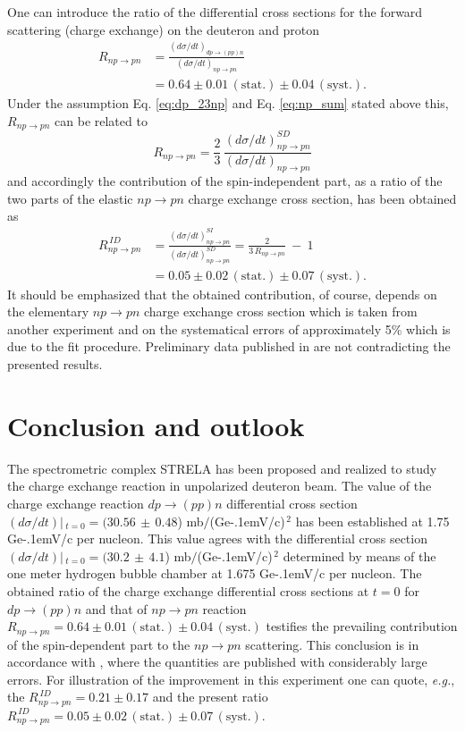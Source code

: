 \documentclass[twocolumn,epjc3]{svjour3}
\newcommand{\np}     {\ensuremath{np \rightarrow pn}\xspace}
\newcommand{\dpchex} {\ensuremath{dp \rightarrow (pp)n}\xspace}
\newcommand{\GeVc}   {Ge\kern-.1emV/c\xspace}
\begin{document}
One can introduce the ratio of the differential cross sections for the forward
scattering (charge exchange) on the deuteron and proton
\begin{equation}
  \begin{split}
    R_{\np} &= \frac{(d\sigma/dt)_{\dpchex}}{(d\sigma/dt)_{\np}} \\
    &= 0.64 \pm 0.01\,\mathrm{(stat.)} \pm 0.04\,\mathrm{(syst.)}.
  \end{split}
\end{equation}
Under the assumption Eq. \eqref{eq:dp_23np} and Eq. \eqref{eq:np_sum} stated
above this, $R_{\np}$ can be related to
\begin{equation}
  R_{\np} = \frac{2}{3}\,\frac{(d\sigma/dt)^{SD}_{\np}}{(d\sigma/dt)_{\np}}
\end{equation}
and accordingly the contribution of the spin-independent part, as a ratio of the
two parts of the elastic \np charge exchange cross section, has been obtained as
\begin{equation}
  \begin{split}
    R^{\,ID}_{\np} &= \frac{(d\sigma/dt)^{SI}_{\np}}{(d\sigma/dt)^{SD}_{\np}}
    = \frac{2}{3\,R_{\np}} \ - \ 1 \\
    &= 0.05 \pm 0.02\,\mathrm{(stat.)} \pm 0.07\,\mathrm{(syst.)}.
  \end{split}
\end{equation}
It should be emphasized that the obtained contribution, of course, depends on
the elementary \np charge exchange cross section which is taken from another
experiment and on the systematical errors of approximately 5\% which is due to
the fit procedure. Preliminary data published in \cite{bas14,bas16} are not
contradicting the presented results.

\section{Conclusion and outlook}
The spectrometric complex STRELA has been proposed and realized to study the
charge exchange reaction in unpola\-rized deuteron beam. The value of the charge
exchange reaction \dpchex differential cross section
$(d\sigma/dt)|\,_{t=0}=(30.56\,\pm\,0.48$) mb$/$(\GeVc)$^{\,2}$ has been
established at 1.75 \GeVc per nucleon. This value agrees with the differential
cross section $(d\sigma/dt)|\,_{t=0}=(30.2\,\pm\,4.1$) mb$/$(\GeVc)$^{\,2}$
determined by means of the one meter hydrogen bubble chamber at 1.675 \GeVc per
nucleon. The obtained ratio of the charge exchange differential cross sections
at $t=0$ for \dpchex and that of \np reaction
$R_{\np} = 0.64 \pm 0.01\,\mathrm{(stat.)} \pm 0.04\,\mathrm{(syst.)}$ testifies
the prevailing contribution of the spin-dependent part to the \np scattering.
This conclusion is in accordance with \cite{gla08}, where the quantities are
published with considerably large errors. For illustration of the improvement in
this experiment one can quote, \textit{e.g.}, the
$R^{\,ID}_{\np} = 0.21 \pm 0.17$ \cite{gla08} and the present ratio
$R^{\,ID}_{\np} = 0.05 \pm 0.02\,\mathrm{(stat.)} \pm 0.07\,\mathrm{(syst.)}$.
\end{document}
